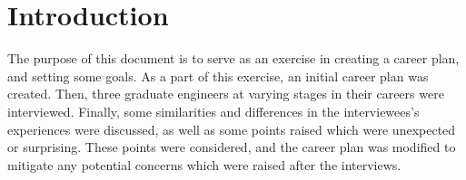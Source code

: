 \section{Introduction}

The purpose of this document is to serve as an exercise in creating a career
plan, and setting some goals. As a part of this exercise, an initial career
plan was created. Then, three graduate engineers at varying stages in their
careers were interviewed. Finally, some similarities and differences in the
interviewees's  experiences were discussed, as well as some points raised which
were unexpected or surprising. These points were considered, and the career
plan was modified to mitigate any potential concerns which were raised after
the interviews.
